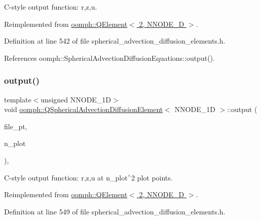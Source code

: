 C-\/style output function\+: r,z,u. 



Reimplemented from \hyperlink{classoomph_1_1QElement_3_012_00_01NNODE__1D_01_4_a08e9ce84ba8787b25935f18c00996a5d}{oomph\+::\+Q\+Element$<$ 2, N\+N\+O\+D\+E\+\_\+D $>$}.



Definition at line 542 of file spherical\+\_\+advection\+\_\+diffusion\+\_\+elements.\+h.



References oomph\+::\+Spherical\+Advection\+Diffusion\+Equations\+::output().

\mbox{\label{classoomph_1_1QSphericalAdvectionDiffusionElement_a16854bbf99abd7b8512474992a29f72b}} 
\subsubsection{\texorpdfstring{output()}{output()}\hspace{0.1cm}{\footnotesize\ttfamily [4/4]}}
{\footnotesize\ttfamily template$<$unsigned N\+N\+O\+D\+E\+\_\+1D$>$ \\
void \hyperlink{classoomph_1_1QSphericalAdvectionDiffusionElement}{oomph\+::\+Q\+Spherical\+Advection\+Diffusion\+Element}$<$ N\+N\+O\+D\+E\+\_\+1D $>$\+::output (\begin{DoxyParamCaption}\item[{F\+I\+LE $\ast$}]{file\+\_\+pt,  }\item[{const unsigned \&}]{n\+\_\+plot }\end{DoxyParamCaption})\hspace{0.3cm}{\ttfamily [inline]}, {\ttfamily [virtual]}}



C-\/style output function\+: r,z,u at n\+\_\+plot$^\wedge$2 plot points. 



Reimplemented from \hyperlink{classoomph_1_1QElement_3_012_00_01NNODE__1D_01_4_aeaa407209398e3c0daf6968520d774ec}{oomph\+::\+Q\+Element$<$ 2, N\+N\+O\+D\+E\+\_\+D $>$}.



Definition at line 549 of file spherical\+\_\+advection\+\_\+diffusion\+\_\+elements.\+h.



